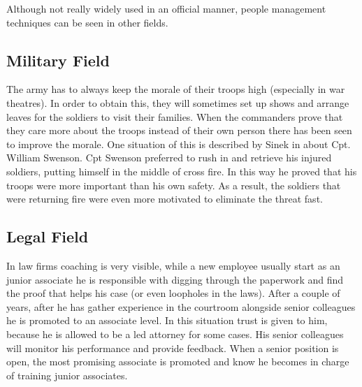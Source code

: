 Although not really widely used in an official manner, people management techniques can be seen in other fields.
\subsection{Military Field}
\label{subsec:military}
The army has to always keep the morale of their troops high (especially in war theatres). In order to obtain this, they will sometimes set up shows and arrange leaves for the soldiers to visit their families. When the commanders prove that they care more about the troops instead of their own person there has been seen to improve the morale. One situation of this is described by Sinek in \cite{safe} about Cpt. William Swenson. Cpt Swenson preferred to rush in and retrieve his injured soldiers, putting himself in the middle of cross fire. In this way he proved that his troops were more important than his own safety. As a result, the soldiers that were returning fire were even more motivated to eliminate the threat fast.

\subsection{Legal Field}
\label{subsec:legal}
In law firms coaching is very visible, while a new employee usually start as an junior associate he is responsible with digging through the paperwork and find the proof that helps his case (or even loopholes in the laws). After a couple of years, after he has gather experience in the courtroom alongside senior colleagues he is promoted to an associate level. In this situation trust is given to him, because he is allowed to be a led attorney for some cases. His senior colleagues will monitor his performance and provide feedback. When a senior position is open, the most promising associate is promoted and know he becomes in charge of training junior associates.
